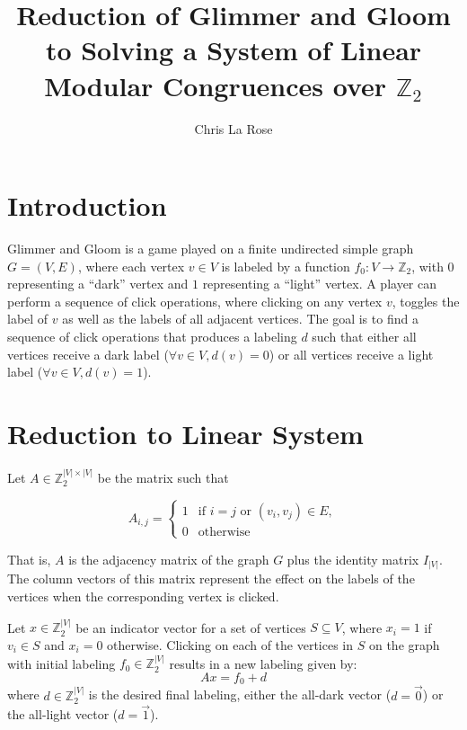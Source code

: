 \documentclass{article}
\title{Reduction of Glimmer and Gloom to Solving a System of Linear Modular Congruences over \(\mathbb{Z}_2\)}
\author{Chris La Rose}
\begin{document}
\maketitle

\section{Introduction}

Glimmer and Gloom is a game played on a finite undirected simple graph \( G = (V, E) \), where each vertex \( v \in V \) is labeled by a function \( f_0: V \to \mathbb{Z}_2 \), with \( 0 \) representing a ``dark'' vertex and \( 1 \) representing a ``light'' vertex. A player can perform a sequence of click operations, where clicking on any vertex \( v \),  toggles the label of \( v \) as well as the labels of all adjacent vertices. The goal is to find a sequence of click operations that produces a labeling \( d \) such that either all vertices receive a dark label (\(\forall v \in V, d(v) = 0 \)) or all vertices receive a light label (\( \forall v \in V, d(v) = 1 \)).

\section{Reduction to Linear System}

Let \( A \in \mathbb{Z}_2^{|V| \times |V|} \) be the matrix such that

\[
  A_{i,j} =
  \begin{cases}
        1 & \text{if } i = j \text{ or } (v_i, v_j) \in E, \\
        0 & \text{otherwise}
  \end{cases}
\]

That is, \( A \) is the adjacency matrix of the graph \( G \) plus the identity matrix \( I_{|V|} \). The column vectors of this matrix represent the effect on the labels of the vertices when the corresponding vertex is clicked.

Let  \( x \in \mathbb{Z}_2^{|V|} \) be an indicator vector for a set of vertices \( S \subseteq V \), where \( x_i = 1 \) if \( v_i \in S \) and \( x_i = 0 \) otherwise. Clicking on each of the vertices in \( S \) on the graph with initial labeling \( f_0 \in \mathbb{Z}_2^{|V|} \) results in a new labeling given by:
\[
    A x = f_0 + d
\]
where \( d \in \mathbb{Z}_2^{|V|} \) is the desired final labeling, either the all-dark vector (\( d = \vec{0} \)) or the all-light vector (\( d = \vec{1} \)).
\end{document}
